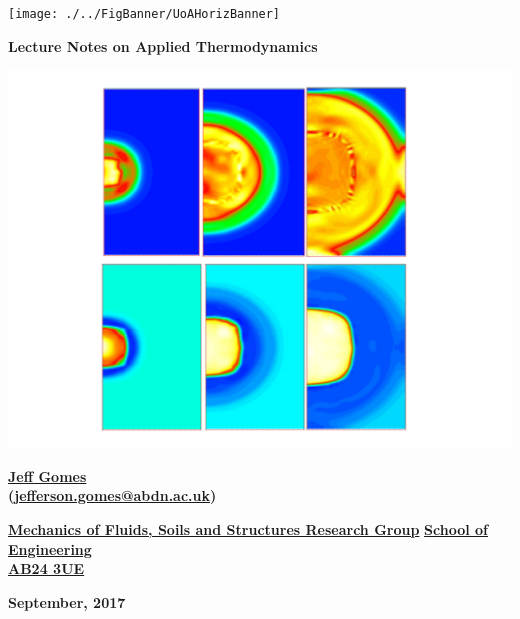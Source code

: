 \documentclass[11pts,a4paper,amsmath,amssymb,floatfix]{book}
\theoremstyle{definition}
\begin{document}
\let\cleardoublepage\clearpage

\vspace{4cm}

\begin{titlepage}
  \vspace{3.5cm}

            \texttt{[image: ./../FigBanner/UoAHorizBanner]}

  \begin{center}

     \vspace{1.cm}

     {\bf{\Huge Lecture Notes on Applied Thermodynamics}} 
     \vspace{1.5cm}
      
      \includegraphics[width=.7\linewidth,height=.5\linewidth,clip]{./Pics/WasteRepos.png}

     \vspace{2cm}
 
     {\Large{\bf \href{tinyurl.com/nlzzbg7}{Jeff Gomes}}}\\
     {\Large{\bf (\href{mailto:jefferson.gomes@abdn.ac.uk}{jefferson.gomes@abdn.ac.uk})}}

     \vspace{1cm}
      {\Large{\bf \href{https://www.abdn.ac.uk/engineering/research/environmental-industrial-fluid-mechanics-122.php}{Mechanics of Fluids, Soils and Structures Research Group}}}
      {\Large{\bf \href{https://www.abdn.ac.uk/engineering/}{School of Engineering}}}\\
      {\Large{\bf \href{https://goo.gl/maps/q3uF9gKyLTN2}{AB24 3UE}}}



     \vspace{2cm}
     {\Large{\bf September, 2017}} %
  \end{center}


\end{titlepage}
\end{document}
